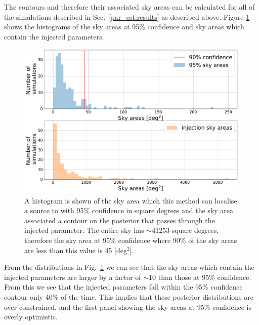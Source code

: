 The contours and therefore their associated sky areas can be calculated for all of the simulations described in Sec.~\ref{par_est:results} as described above. 
Figure \ref{par_est:results:sky_area} shows the histograms of the sky areas at 95\% confidence and sky areas which contain the injected parameters.
%
\begin{figure}[ht]
    \centering
    \includegraphics[width=\linewidth]{C5_parameter/sky_area_hist.pdf}
    \caption[p-p plot for the CW simulations]{A histogram is shown of the sky area which this method can localise a source to with 95\% confidence in square degrees and the sky area associated a contour on the posterior that passes through the injected parameter. The entire sky has $\sim 41253$ square degrees, therefore the sky area at 95\% confidence where 90\% of the sky areas are less than this value is 45 [deg$^2$].  }
    \label{par_est:results:sky_area}
\end{figure}
%
From the distributions in Fig.~\ref{par_est:results:sky_area} we can see that the sky areas which contain the injected parameters are larger by a factor of $\sim 10$ than those at 95\% confidence.
From this we see that the injected parameters fall within the 95\% confidence contour only 40\% of the time.
This implies that these posterior distributions are over constrained, and the first panel showing the sky areas at 95\% confidence is overly optimistic. \textbf{}

